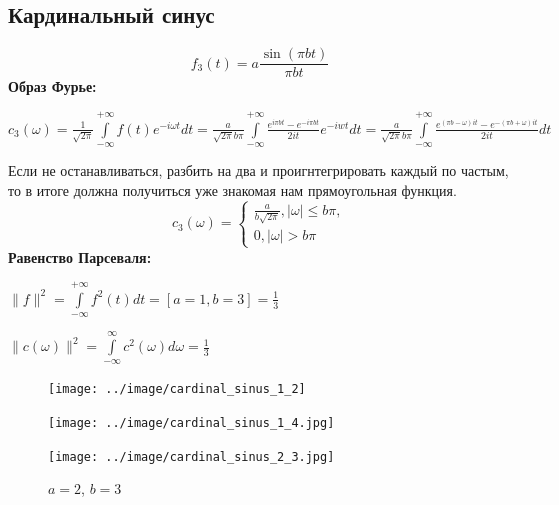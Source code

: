   \subsection{Кардинальный синус}
  \[
  f_3(t) =  
    a \frac{\sin(\pi bt)}{\pi bt}
  \]
  \textbf{Образ Фурье: }
  \\
  \begin{center}
    $c_3(\omega) = \frac{1}{\sqrt{2\pi}} \int\limits_{-\infty}^{+\infty}f(t)e^{-i\omega t}dt = 
  \frac{a}{\sqrt{2\pi}b\pi}\int\limits_{-\infty}^{+\infty} \frac{e^{i\pi bt} - e^{-i\pi bt} }{2it}e^{-iwt} dt=
  \frac{a}{\sqrt{2\pi} b \pi} \int \limits_{-\infty}^{+\infty}\frac{e^{(\pi b-\omega)it} - e^{-(\pi b+\omega)it}}{2i t}dt
  $
  \end{center}
  \noindent Если не останавливаться, разбить на два и проигнтегрировать каждый по частым, то в итоге должна получиться уже знакомая нам прямоугольная функция.\\
  \[c_3(\omega) = 
  \begin{cases}
    \frac{a}{b\sqrt{2 \pi}}, |\omega| \leq b\pi,\\
    0, |\omega| > b\pi
  \end{cases}
  \]
  \textbf{Равенство Парсеваля:}
  \begin{center}
    $\parallel f \parallel^2 = \int\limits_{-\infty}^{+\infty} f^2(t) dt= [a = 1, b = 3] = \frac{1}{3}  $
  \end{center}
  \begin{center}
    $\parallel c(\omega)\parallel^ 2 = \int\limits_{-\infty}^{\infty}c^2(\omega)d\omega = \frac{1}{3} $
  \end{center}
  \begin{figure}[!htb]
      \texttt{[image: ../image/cardinal\_sinus\_1\_2]}
      \caption{$a=1$, $b=2$}
    \endminipage\hfill
      \texttt{[image: ../image/cardinal\_sinus\_1\_4.jpg]}
      \caption{$a = 1$, $b = 4$}
    \endminipage\hfill
      \texttt{[image: ../image/cardinal\_sinus\_2\_3.jpg]}
      \caption{$a = 2$, $b = 3$}
    \endminipage
    \end{figure}
